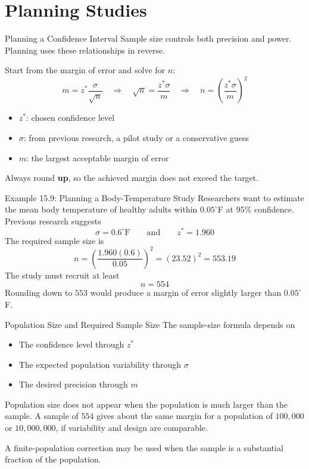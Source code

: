 \documentclass[aspectratio=169]{beamer}
\begin{document}
\section{Planning Studies}

\begin{frame}{Planning a Confidence Interval}
Sample size controls both precision and power. Planning uses these relationships in reverse.

\vspace{0.15cm}
Start from the margin of error and solve for $n$:
$$m=z^*\frac{\sigma}{\sqrt{n}} \quad\Longrightarrow\quad \sqrt{n}=\frac{z^*\sigma}{m} \quad\Longrightarrow\quad n=\left(\frac{z^*\sigma}{m}\right)^2$$
\begin{itemize}
  \item $z^*$: chosen confidence level
  \item $\sigma$: from previous research, a pilot study or a conservative guess
  \item $m$: the largest acceptable margin of error
\end{itemize}
Always round \textbf{up}, so the achieved margin does not exceed the target.
\end{frame}

\begin{frame}{Example 15.9: Planning a Body-Temperature Study}
Researchers want to estimate the mean body temperature of healthy adults within $0.05^\circ$F at $95\%$ confidence. Previous research suggests
$$\sigma=0.6^\circ\mathrm{F}\qquad\text{and}\qquad z^*=1.960$$
The required sample size is
$$n=\left(\frac{1.960(0.6)}{0.05}\right)^2=(23.52)^2=553.19$$
The study must recruit at least
$$\boxed{n=554}$$
Rounding down to $553$ would produce a margin of error slightly larger than $0.05^\circ$F.
\end{frame}

\begin{frame}{Population Size and Required Sample Size}
The sample-size formula depends on
\begin{itemize}
  \item The confidence level through $z^*$
  \item The expected population variability through $\sigma$
  \item The desired precision through $m$
\end{itemize}

\vspace{0.2cm}
Population size does not appear when the population is much larger than the sample. A sample of $554$ gives about the same margin for a population of $100{,}000$ or $10{,}000{,}000$, if variability and design are comparable.

\vspace{0.2cm}
A finite-population correction may be used when the sample is a substantial fraction of the population.
\end{frame}
\end{document}
